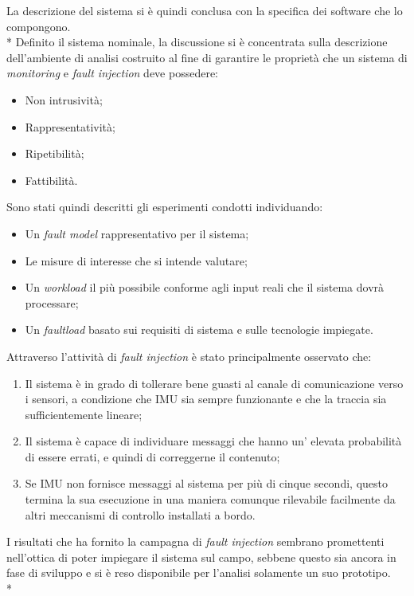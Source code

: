 La descrizione del sistema si \`e quindi conclusa con la specifica dei software che lo compongono.\\*
Definito il sistema nominale, la discussione si \`e concentrata sulla descrizione dell'ambiente di analisi costruito al fine di garantire le propriet\`a che un sistema di \emph{monitoring} e \emph{fault injection} deve possedere:
\begin{itemize}
	\item Non intrusivit\`a;
	\item Rappresentativit\`a;
	\item Ripetibilit\`a;
	\item Fattibilit\`a.
\end{itemize}
Sono stati quindi descritti gli esperimenti condotti individuando:
\begin{itemize}
	\item Un \emph{fault model} rappresentativo per il sistema;
	\item Le misure di interesse che si intende valutare;
	\item Un \emph{workload} il pi\`u possibile conforme agli input reali che il sistema dovr\`a processare;
	\item Un \emph{faultload} basato sui requisiti di sistema e sulle tecnologie impiegate.
\end{itemize}
Attraverso l'attivit\`a di \emph{fault injection} \`e stato principalmente osservato che:
\begin{enumerate}
	\item  Il sistema \`e in grado di tollerare bene guasti al canale di comunicazione verso i sensori, a condizione che IMU sia sempre funzionante e che la traccia sia sufficientemente lineare;
	\item Il sistema \`e capace di individuare messaggi che hanno un' elevata probabilit\`a di essere errati, e quindi di correggerne il contenuto;
	\item Se IMU non fornisce messaggi al sistema per pi\`u di cinque secondi, questo termina la sua esecuzione in una maniera comunque rilevabile facilmente da altri meccanismi di controllo installati a bordo.
\end{enumerate}
I risultati che ha fornito la campagna di \emph{fault injection} sembrano promettenti nell'ottica di poter impiegare il sistema sul campo, sebbene questo sia ancora in fase di sviluppo e si \`e reso disponibile per l'analisi solamente un suo prototipo.\\*